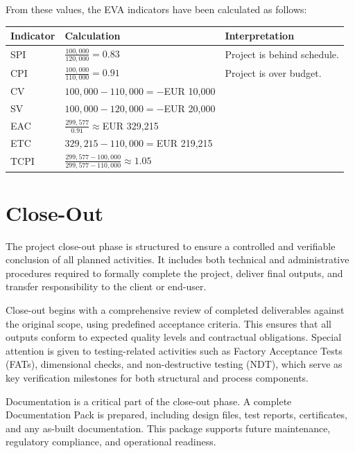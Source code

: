 From these values, the EVA indicators have been calculated as follows:

\begin{table}[h]
\centering
\begin{tabular}{|p{10em}|p{10em}|p{10em}|}
\hline
\textbf{Indicator} & \textbf{Calculation} & \textbf{Interpretation} \\
\hline
SPI & $ \frac{100,000}{120,000} = 0.83 $ & Project is behind schedule. \\
\hline
CPI & $ \frac{100,000}{110,000} = 0.91 $ & Project is over budget. \\
\hline
CV & $ 100,000 - 110,000 = -$EUR 10,000 & \\
\hline
SV & $ 100,000 - 120,000 = -$EUR 20,000 & \\
\hline
EAC & $ \frac{299,577}{0.91} \approx $EUR 329,215 & \\
\hline
ETC & $ 329,215 - 110,000 = $EUR 219,215 & \\
\hline
TCPI & $ \frac{299,577 - 100,000}{299,577 - 110,000} \approx 1.05 $ & \\
\hline
\end{tabular}
\end{table}

\section{Close-Out}

The project close-out phase is structured to ensure a controlled and verifiable conclusion of all planned activities. It includes both technical and administrative procedures required to formally complete the project, deliver final outputs, and transfer responsibility to the client or end-user.

Close-out begins with a comprehensive review of completed deliverables against the original scope, using predefined acceptance criteria. This ensures that all outputs conform to expected quality levels and contractual obligations. Special attention is given to testing-related activities such as Factory Acceptance Tests (FATs), dimensional checks, and non-destructive testing (NDT), which serve as key verification milestones for both structural and process components.

Documentation is a critical part of the close-out phase. A complete Documentation Pack is prepared, including design files, test reports, certificates, and any as-built documentation. This package supports future maintenance, regulatory compliance, and operational readiness.

